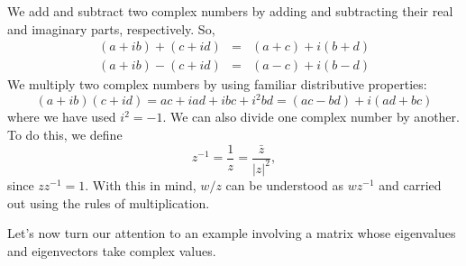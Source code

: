\documentclass[../book.tex]{subfiles}
\begin{document}
We add and subtract two complex numbers by adding and subtracting their real and imaginary parts, respectively. So,
\begin{equation}\label{eq:eig-16}
\begin{array}{lcl}
  ( a + i b) + ( c + i d) &=& (a+c) + i (b+d) \\
  ( a + i b) - ( c + i d) &=& (a-c) + i (b-d)
\end{array}
\end{equation}
We multiply two complex numbers by using familiar distributive properties:
\begin{equation}\label{eq:eig-17}
(a+i b)(c+i d) 
= a c + i a d + i b c + i^2 b d 
= (a c - b d) + i (a d + b c)
\end{equation}
where we have used \(i^2=-1\). We can also divide one complex number by another. To do this, we define
\begin{equation}\label{eq:eig-18}
z^{-1} = \frac{1}{z} = \frac{\bar z}{|z|^2},
\end{equation}
since \(z z^{-1} = 1\). With this in mind, \(w/z\) can be understood as \(w  z^{-1}\) and carried out using the rules of multiplication.

Let's now turn our attention to an example involving a matrix whose eigenvalues and eigenvectors take complex values.
\end{document}
